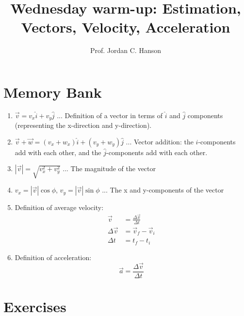 \documentclass{article}
\begin{document}
\twocolumn

\title{Wednesday warm-up: Estimation, Vectors, Velocity, Acceleration}
\author{Prof. Jordan C. Hanson}

\maketitle

\section{Memory Bank}

\begin{enumerate}
\item $\vec{v} = v_x \hat{i} + v_y \hat{j}$ ... Definition of a vector in terms of $\hat{i}$ and $\hat{j}$ components (representing the x-direction and y-direction).
\item $\vec{v} + \vec{w} = (v_x + w_x) \hat{i} + (v_y + w_y) \hat{j}$ ... Vector addition: the $\hat{i}$-components add with each other, and the $\hat{j}$-components add with each other.\
\item $|\vec{v}| = \sqrt{v_x^2 + v_y^2}$ ... The magnitude of the vector
\item $v_x = |\vec{v}| \cos\phi$, $v_y = |\vec{v}| \sin\phi$ ... The x and y-components of the vector
\item Definition of average velocity:
\begin{align}
\vec{v} &= \frac{\Delta \vec{x}}{\Delta t} \\
\Delta \vec{v} &= \vec{v}_f - \vec{v}_i \\
\Delta t &= t_f - t_i
\end{align}
\item Definition of acceleration:
\begin{equation}
\vec{a} = \frac{\Delta \vec{v}}{\Delta t}
\end{equation}
\end{enumerate}

\section{Exercises}
\end{document}
